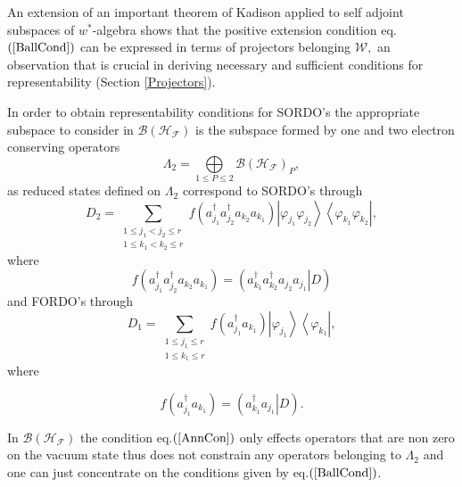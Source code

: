 \documentclass[aps,preprint]{revtex4}%
\begin{document}
An extension of an important theorem of Kadison \cite{Kadison} applied to self
adjoint subspaces of $w^{\ast}$-algebra shows that the positive extension
condition eq.$\left(  \ref{BallCond}\right)  $ can be expressed in terms of
projectors belonging $\mathcal{W},$ an observation that is crucial in deriving
necessary and sufficient conditions for representability (Section
\ref{Projectors}).

In order to obtain representability conditions for SORDO's the appropriate
subspace to consider in $\mathcal{B}\left(  \mathcal{H}_{\mathcal{F}}\right)
$ is the subspace formed by one and two electron conserving operators
\begin{equation}
\Lambda_{2}=%
{\displaystyle\bigoplus\limits_{1\leq P\leq2}}
\mathcal{B}\left(  \mathcal{H}_{\mathcal{F}}\right)  _{P},
\end{equation}
as reduced states defined on $\Lambda_{2}$ correspond to SORDO's through%
\begin{equation}
D_{2}=\sum_{\substack{1\leq j_{1}<j_{2}\leq r\\1\leq k_{1}<k_{2}\leq
r}}f\left(  a_{j_{1}}^{\dagger}a_{j_{2}}^{\dagger}a_{k_{2}}a_{k_{1}}\right)
\left\vert \varphi_{j_{1}}\varphi_{j_{2}}\right\rangle \left\langle
\varphi_{k_{1}}\varphi_{k_{2}}\right\vert ,
\end{equation}
where%
\begin{equation}
f\left(  a_{j_{1}}^{\dagger}a_{j_{2}}^{\dagger}a_{k_{2}}a_{k_{1}}\right)
=\left(  \left.  a_{k_{1}}^{\dagger}a_{k_{2}}^{\dagger}a_{j_{2}}a_{j_{1}%
}\right\vert D\right)
\end{equation}
and FORDO's through
\begin{equation}
D_{1}=\sum_{\substack{1\leq j_{1}\leq r\\1\leq k_{1}\leq r}}f\left(  a_{j_{1}%
}^{\dagger}a_{k_{1}}\right)  \left\vert \varphi_{j_{1}}\right\rangle
\left\langle \varphi_{k_{1}}\right\vert ,
\end{equation}
where%

\begin{equation}
f\left(  a_{j_{1}}^{\dagger}a_{k_{1}}\right)  =\left(  \left.  a_{k_{1}%
}^{\dagger}a_{j_{1}}\right\vert D\right)  .
\end{equation}


In $\mathcal{B}\left(  \mathcal{H}_{\mathcal{F}}\right)  $ the condition
eq.$\left(  \ref{AnnCon}\right)  $ only effects operators that are non zero on
the vacuum state thus does not constrain any operators belonging to
$\Lambda_{2}$ and one can just concentrate on the conditions given by
eq.$\left(  \ref{BallCond}\right)  $.
\end{document}
